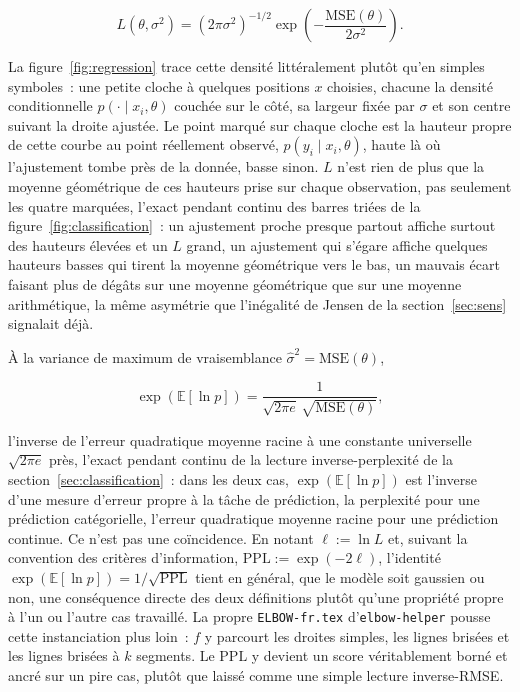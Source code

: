 \documentclass[11pt]{article}
\newcommand{\code}[1]{\texttt{#1}}
\begin{document}
\begin{equation}
L(\theta,\sigma^2) = (2\pi\sigma^2)^{-1/2}\exp\!\left(-\frac{\mathrm{MSE}(\theta)}{2\sigma^2}\right).
\end{equation}

La figure~\ref{fig:regression} trace cette densité littéralement
plutôt qu'en simples symboles~: une petite cloche à quelques positions
$x$ choisies, chacune la densité conditionnelle $p(\cdot \mid
x_i,\theta)$ couchée sur le côté, sa largeur fixée par $\sigma$ et son
centre suivant la droite ajustée. Le point marqué sur chaque cloche
est la hauteur propre de cette courbe au point réellement observé,
$p(y_i \mid x_i,\theta)$, haute là où l'ajustement tombe près de la
donnée, basse sinon. $L$ n'est rien de plus que la moyenne géométrique
de ces hauteurs prise sur chaque observation, pas seulement les quatre
marquées, l'exact pendant continu des barres triées de la
figure~\ref{fig:classification}~: un ajustement proche presque partout
affiche surtout des hauteurs élevées et un $L$ grand, un ajustement
qui s'égare affiche quelques hauteurs basses qui tirent la moyenne
géométrique vers le bas, un mauvais écart faisant plus de dégâts sur
une moyenne géométrique que sur une moyenne arithmétique, la même
asymétrie que l'inégalité de Jensen de la section~\ref{sec:sens}
signalait déjà.

À la variance de maximum de vraisemblance $\hat\sigma^2 =
\mathrm{MSE}(\theta)$,

\begin{equation}
\exp(\mathbb E[\ln p]) = \frac{1}{\sqrt{2\pi e}\,\sqrt{\mathrm{MSE}(\theta)}},
\end{equation}

l'inverse de l'erreur quadratique moyenne racine à une constante
universelle $\sqrt{2\pi e}$ près, l'exact pendant continu de la
lecture inverse-perplexité de la section~\ref{sec:classification}~:
dans les deux cas, $\exp(\mathbb E[\ln p])$ est l'inverse d'une mesure
d'erreur propre à la tâche de prédiction, la perplexité pour une
prédiction catégorielle, l'erreur quadratique moyenne racine pour une
prédiction continue. Ce n'est pas une coïncidence. En notant $\ell :=
\ln L$ et, suivant la convention des critères d'information,
$\mathrm{PPL} := \exp(-2\ell)$, l'identité $\exp(\mathbb E[\ln p]) =
1/\sqrt{\mathrm{PPL}}$ tient en général, que le modèle soit gaussien ou
non, une conséquence directe des deux définitions plutôt qu'une
propriété propre à l'un ou l'autre cas travaillé. La propre
\code{ELBOW-fr.tex} d'\code{elbow-helper} pousse cette instanciation
plus loin~: $f$ y parcourt les droites simples, les lignes brisées et
les lignes brisées à $k$ segments. Le $\mathrm{PPL}$ y devient un
score véritablement borné et ancré sur un pire cas, plutôt que laissé
comme une simple lecture inverse-RMSE.
\end{document}
